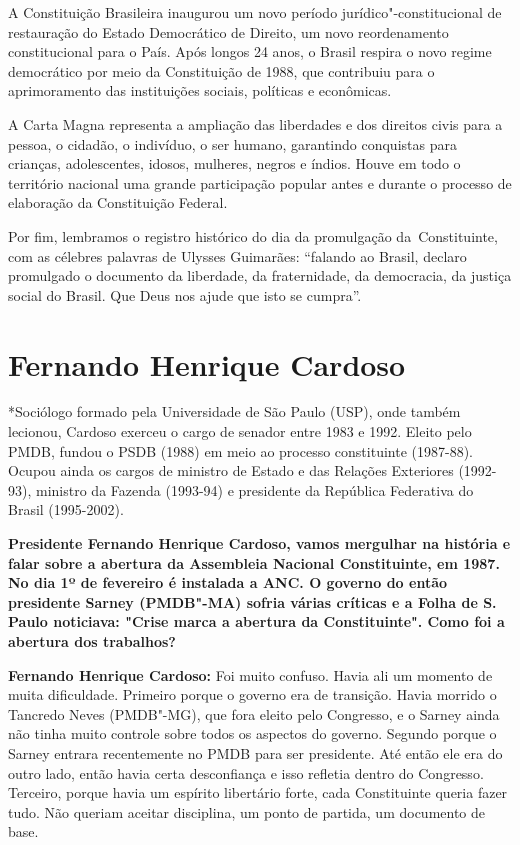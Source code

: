 A Constituição Brasileira inaugurou um novo período
jurídico"-constitucional de restauração do Estado Democrático de Direito,
um novo reordenamento constitucional para o País. Após longos 24 anos, o
Brasil respira o novo regime democrático por meio da Constituição de
1988, que contribuiu para o aprimoramento das instituições sociais,
políticas e econômicas.

A Carta Magna representa a ampliação das liberdades e dos direitos civis
para a pessoa, o cidadão, o indivíduo, o ser humano, garantindo
conquistas para crianças, adolescentes, idosos, mulheres, negros e
índios. Houve em todo o território nacional uma grande participação
popular antes e durante o processo de elaboração da Constituição
Federal.

Por fim, lembramos o registro histórico do dia da promulgação
da~Constituinte, com as célebres palavras de Ulysses Guimarães:
``falando ao Brasil, declaro promulgado o documento da liberdade, da
fraternidade, da democracia, da justiça social do Brasil. Que Deus nos
ajude que isto se cumpra''.

\section{Fernando Henrique Cardoso}

*Sociólogo formado pela Universidade de São Paulo (USP), onde também
lecionou, Cardoso exerceu o cargo de senador entre 1983 e 1992. Eleito
pelo PMDB, fundou o PSDB (1988) em meio ao processo constituinte
(1987-88). Ocupou ainda os cargos de ministro de Estado e das Relações
Exteriores (1992-93), ministro da Fazenda (1993-94) e presidente da
República Federativa do Brasil (1995-2002).

\textbf{Presidente Fernando Henrique Cardoso, vamos mergulhar na
história e falar sobre a abertura da Assembleia Nacional Constituinte,
em 1987. No dia 1º de fevereiro é instalada a ANC. O governo do então
presidente Sarney (PMDB"-MA) sofria várias críticas e a Folha de S. Paulo
noticiava: "Crise marca a abertura da Constituinte". Como foi a abertura
dos trabalhos?}

\textbf{Fernando Henrique Cardoso:} Foi muito confuso. Havia ali um
momento de muita dificuldade. Primeiro porque o governo era de
transição. Havia morrido o Tancredo Neves (PMDB"-MG), que fora eleito
pelo Congresso, e o Sarney ainda não tinha muito controle sobre todos os
aspectos do governo. Segundo porque o Sarney entrara recentemente no
PMDB para ser presidente. Até então ele era do outro lado, então havia
certa desconfiança e isso refletia dentro do Congresso. Terceiro, porque
havia um espírito libertário forte, cada Constituinte queria fazer tudo.
Não queriam aceitar disciplina, um ponto de partida, um documento de
base.

